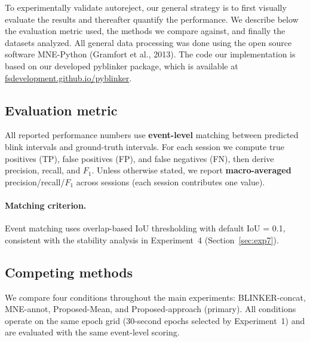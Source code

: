 To experimentally validate autoreject, our general strategy is to first visually evaluate the results and thereafter quantify the performance. We describe below the evaluation metric used, the methods we compare against, and finally the datasets analyzed. All general data processing was done using the open source software MNE-Python (Gramfort et al., 2013). The code our implementation is based on our developed pyblinker package, which is available at \url{fsdevelopment.github.io/pyblinker}. \subsection{Evaluation metric} \label{sec:eval_metric_protocol} All reported performance numbers use \textbf{event-level} matching between predicted blink intervals and ground-truth intervals. For each session we compute true positives (TP), false positives (FP), and false negatives (FN), then derive precision, recall, and $F_1$. Unless otherwise stated, we report \textbf{macro-averaged} precision/recall/$F_1$ across sessions (each session contributes one value). \paragraph{Matching criterion.} Event matching uses overlap-based IoU thresholding with default IoU = 0.1, consistent with the stability analysis in Experiment~4 (Section~\ref{sec:exp7}). \subsection{Competing methods} \label{sec:competing_methods_protocol} We compare four conditions throughout the main experiments: BLINKER-concat, MNE-annot, Proposed-Mean, and Proposed-approach (primary). All conditions operate on the same epoch grid (30-second epochs selected by Experiment~1) and are evaluated with the same event-level scoring.
